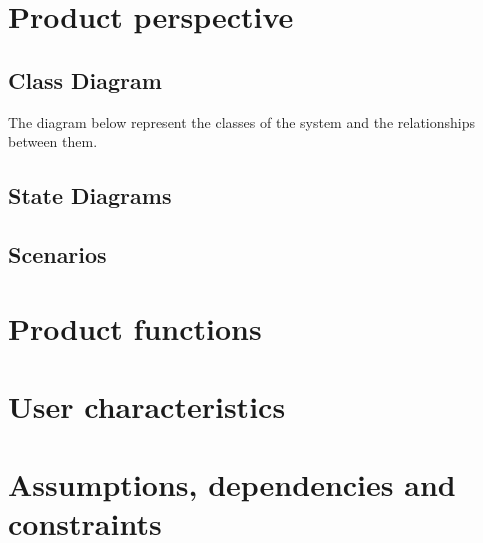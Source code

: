 \section{Product perspective}
\label{s:Product_perspective}%

\subsection{Class Diagram}
\label{ss:class_diagram}%
The diagram below represent the classes of the system and the relationships between them.

\subsection{State Diagrams}
\label{ss:state_diagrams}%

\subsection{Scenarios}
\label{ss:scenarios}%

\section{Product functions}
\label{s:Product_functions}%

\section{User characteristics}
\label{s:User_characteristics}%


\section{Assumptions, dependencies and constraints}
\label{s:Assumptions_dependencies_and_constraints}%


